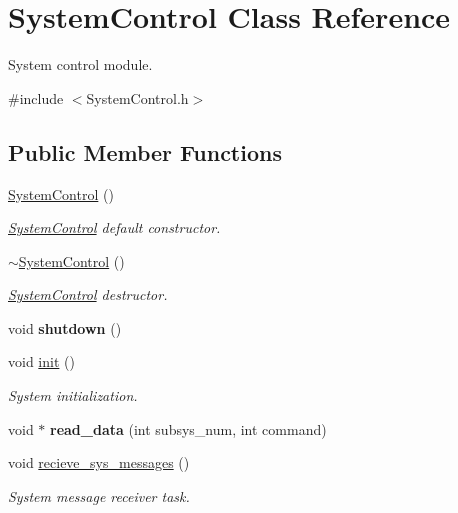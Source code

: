 \hypertarget{classSystemControl}{\section{System\-Control Class Reference}
\label{classSystemControl}
}


System control module.  




{\ttfamily \#include $<$System\-Control.\-h$>$}

\subsection*{Public Member Functions}
\begin{DoxyCompactItemize}
\item 
\hyperlink{classSystemControl_ae07ba4f7b5ee117619f376efd3b60fa9}{System\-Control} ()
\begin{DoxyCompactList}\small\item\em \hyperlink{classSystemControl}{System\-Control} default constructor. \end{DoxyCompactList}\item 
\hyperlink{classSystemControl_a431eb4f5fbb81a358a345653c7444874}{$\sim$\-System\-Control} ()
\begin{DoxyCompactList}\small\item\em \hyperlink{classSystemControl}{System\-Control} destructor. \end{DoxyCompactList}\item 
\hypertarget{classSystemControl_a682a998cbfceabd333584ee1006fbf05}{void {\bfseries shutdown} ()}\label{classSystemControl_a682a998cbfceabd333584ee1006fbf05}

\item 
void \hyperlink{classSystemControl_aeb2cd39e5a72b13e139b8bbefb726be6}{init} ()
\begin{DoxyCompactList}\small\item\em System initialization. \end{DoxyCompactList}\item 
\hypertarget{classSystemControl_ade77f999daab4a062327bbc1a8ad05ef}{void $\ast$ {\bfseries read\-\_\-data} (int subsys\-\_\-num, int command)}\label{classSystemControl_ade77f999daab4a062327bbc1a8ad05ef}

\item 
void \hyperlink{classSystemControl_a25f45e16b1d4dc69ce8c356741feb17d}{recieve\-\_\-sys\-\_\-messages} ()
\begin{DoxyCompactList}\small\item\em System message receiver task. \end{DoxyCompactList}\end{DoxyCompactItemize}
